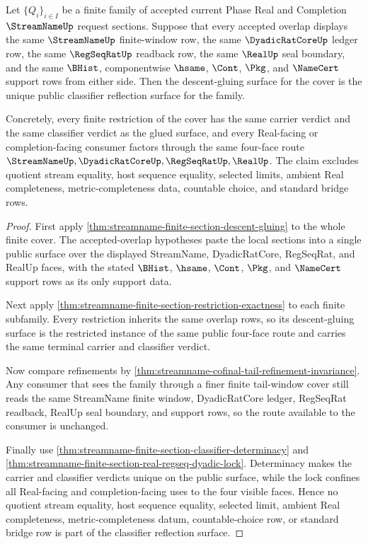 \begin{theorem}
\label{thm:streamname-finite-section-cover-descent-classifier-reflection}
Let $\{Q_i\}_{i \in I}$ be a finite family of accepted current Phase Real and
Completion $\StreamNameUp$ request sections. Suppose that every accepted
overlap displays the same $\StreamNameUp$ finite-window row, the same
$\DyadicRatCoreUp$ ledger row, the same $\RegSeqRatUp$ readback row, the same
$\RealUp$ seal boundary, and the same $\BHist$, componentwise $\hsame$, $\Cont$,
$\Pkg$, and $\NameCert$ support rows from either side. Then the
descent-gluing surface for the cover is the unique public classifier reflection
surface for the family.

Concretely, every finite restriction of the cover has the same carrier verdict
and the same classifier verdict as the glued surface, and every Real-facing or
completion-facing consumer factors through the same four-face route
$\StreamNameUp,\DyadicRatCoreUp,\RegSeqRatUp,\RealUp$. The claim excludes
quotient stream equality, host sequence equality, selected limits, ambient Real
completeness, metric-completeness data, countable choice, and standard bridge
rows.
\end{theorem}
\begin{proof}
First apply \autoref{thm:streamname-finite-section-descent-gluing} to the whole
finite cover. The accepted-overlap hypotheses paste the local sections into a
single public surface over the displayed StreamName, DyadicRatCore, RegSeqRat,
and RealUp faces, with the stated $\BHist$, $\hsame$, $\Cont$, $\Pkg$, and
$\NameCert$ support rows as its only support data.

Next apply \autoref{thm:streamname-finite-section-restriction-exactness} to
each finite subfamily. Every restriction inherits the same overlap rows, so its
descent-gluing surface is the restricted instance of the same public four-face
route and carries the same terminal carrier and classifier verdict.

Now compare refinements by
\autoref{thm:streamname-cofinal-tail-refinement-invariance}. Any consumer that
sees the family through a finer finite tail-window cover still reads the same
StreamName finite window, DyadicRatCore ledger, RegSeqRat readback, RealUp seal
boundary, and support rows, so the route available to the consumer is unchanged.

Finally use \autoref{thm:streamname-finite-section-classifier-determinacy} and
\autoref{thm:streamname-finite-section-real-regseq-dyadic-lock}. Determinacy
makes the carrier and classifier verdicts unique on the public surface, while
the lock confines all Real-facing and completion-facing uses to the four visible
faces. Hence no quotient stream equality, host sequence equality, selected
limit, ambient Real completeness, metric-completeness datum, countable-choice
row, or standard bridge row is part of the classifier reflection surface.
\end{proof}

